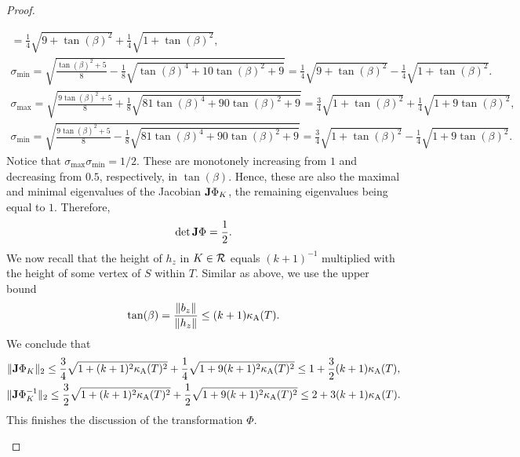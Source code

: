 \documentclass[10pt,a4paper]{article}
\begin{document}
\begin{proof}
\begin{itemize}
\begin{align*}
            =
            \frac 1 4 \sqrt{ 9 + \tan(\beta)^2 } + \frac 1 4 \sqrt{ 1 + \tan(\beta)^2 }
            ,
            \\
            \sigma_{\min} 
            = 
            \sqrt{ \frac{ \tan(\beta)^{2} + 5 }{8} - \frac 1 8 \sqrt{ \tan(\beta)^{4} + 10 \tan(\beta)^{2} + 9 } }
            =
            \frac 1 4 \sqrt{ 9 + \tan(\beta)^2 } - \frac 1 4 \sqrt{ 1 + \tan(\beta)^2 }
            .
        \end{align*}
        \begin{align*}
            \sigma_{\max} 
            = 
            \sqrt{ \frac{ 9\tan(\beta)^{2} + 5 }{8} + \frac 1 8 \sqrt{ 81\tan(\beta)^{4} + 90 \tan(\beta)^{2} + 9 } }
            =
            \frac 3 4 \sqrt{ 1 + \tan(\beta)^2 } + \frac 1 4 \sqrt{ 1 + 9\tan(\beta)^2 }
            ,
            \\
            \sigma_{\min} 
            = 
            \sqrt{ \frac{ 9\tan(\beta)^{2} + 5 }{8} - \frac 1 8 \sqrt{ 81\tan(\beta)^{4} + 90 \tan(\beta)^{2} + 9 } }
            =
            \frac 3 4 \sqrt{ 1 + \tan(\beta)^2 } - \frac 1 4 \sqrt{ 1 + 9\tan(\beta)^2 }
            .
        \end{align*}
        Notice that $\sigma_{\max} \sigma_{\min} = 1/2$. 
        These are monotonely increasing from $1$ and decreasing from $0.5$, respectively, in $\tan(\beta)$. 
        Hence, these are also the maximal and minimal eigenvalues of the Jacobian ${\mathbf{J}} \Phi_{K}$, the remaining eigenvalues being equal to $1$. Therefore,
        \begin{align*}
            \det {\mathbf{J}}\Phi = \frac 1 2.
        \end{align*}
        We now recall that the height of $h_{z}$ in $K \in {\mathcal R}$ equals $(k+1)^{-1}$ multiplied with the height of some vertex of $S$ within $T$.
        Similar as above, we use the upper bound 
        \begin{align*}
            \tan(\beta) = \frac{\|  b_{z}  \|}{\|  h_{z}  \|} \leq (k+1) \kappa_{\rm A}(T).
        \end{align*}
        We conclude that 
        \begin{gather}
            \|  {\mathbf{J}}\Phi_{K}  \|_{2} 
            \leq 
            \frac 3 4 \sqrt{ 1 + (k+1)^2 \kappa_{\rm A}(T)^2 } + \frac 1 4 \sqrt{ 1 + 9(k+1)^2 \kappa_{\rm A}(T)^2 }
            \leq 
            1 + \frac{3}{2} (k+1) \kappa_{\rm A}(T) 
            \label{math:phi_max}
            ,
            \\
            \|  {\mathbf{J}}\Phi_{K}^{-1}  \|_{2} 
            \leq 
            \frac 3 2 \sqrt{ 1 + (k+1)^2 \kappa_{\rm A}(T)^2 } + \frac 1 2 \sqrt{ 1 + 9(k+1)^2 \kappa_{\rm A}(T)^2 }
            \leq 
            2 + 3 (k+1) \kappa_{\rm A}(T) 
            \label{math:phi_min}
            .
        \end{gather}
        This finishes the discussion of the transformation $\Phi$.
        

\end{itemize}
\end{proof}
\end{document}
